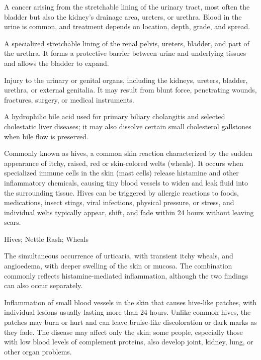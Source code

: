  A cancer arising from the stretchable lining of the urinary tract, most often the bladder but also the kidney’s drainage area, ureters, or urethra. Blood in the urine is common, and treatment depends on location, depth, grade, and spread.

 A specialized stretchable lining of the renal pelvis, ureters, bladder, and part of the urethra. It forms a protective barrier between urine and underlying tissues and allows the bladder to expand.

 Injury to the urinary or genital organs, including the kidneys, ureters, bladder, urethra, or external genitalia. It may result from blunt force, penetrating wounds, fractures, surgery, or medical instruments.

 A hydrophilic bile acid used for primary biliary cholangitis and selected cholestatic liver diseases; it may also dissolve certain small cholesterol gallstones when bile flow is preserved.

 Commonly known as hives, a common skin reaction characterized by the sudden appearance of itchy, raised, red or skin-colored welts (wheals). It occurs when specialized immune cells in the skin (mast cells) release histamine and other inflammatory chemicals, causing tiny blood vessels to widen and leak fluid into the surrounding tissue. Hives can be triggered by allergic reactions to foods, medications, insect stings, viral infections, physical pressure, or stress, and individual welts typically appear, shift, and fade within 24 hours without leaving scars.

\synonyms
Hives; Nettle Rash; Wheals

 The simultaneous occurrence of urticaria, with transient itchy wheals, and angioedema, with deeper swelling of the skin or mucosa. The combination commonly reflects histamine-mediated inflammation, although the two findings can also occur separately.

 Inflammation of small blood vessels in the skin that causes hive-like patches, with individual lesions usually lasting more than 24 hours. Unlike common hives, the patches may burn or hurt and can leave bruise-like discoloration or dark marks as they fade. The disease may affect only the skin; some people, especially those with low blood levels of complement proteins, also develop joint, kidney, lung, or other organ problems.


